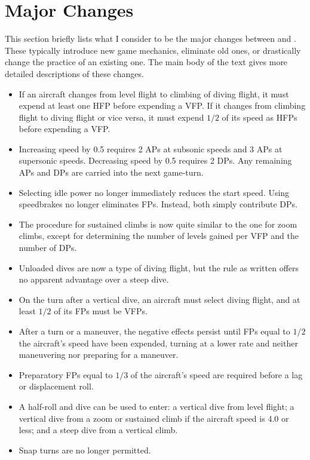 \documentclass[10pt]{article}
\begin{document}
\section{Major Changes}

This section briefly lists what I consider to be the major changes between {\AirSup} and {\AirPow}. These  typically introduce new game mechanics, eliminate old ones, or drastically change the practice of an existing one. The main body of the text gives more detailed descriptions of these changes.

\begin{itemize}
    \item If an aircraft changes from level flight to climbing of diving flight, it must expend at least one HFP before expending a VFP. If it changes from climbing flight to diving flight or vice versa, it must expend $1/2$ of its speed as HFPs before expending a VFP.
    \item Increasing speed by 0.5 requires 2 APs at subsonic speeds and 3 APs at supersonic speeds. Decreasing speed by 0.5 requires 2 DPs. Any remaining APs and DPs are carried into the next game-turn.
    \item Selecting idle power no longer immediately reduces the start speed. Using speedbrakes no longer eliminates FPs. Instead, both simply contribute DPs.
    \item The procedure for sustained climbs is now quite similar to the one for zoom climbs, except for determining the number of levels gained per VFP and the number of DPs.
    \item Unloaded dives are now a type of diving flight, but the rule as written offers no apparent advantage over a steep dive.
    \item On the turn after a vertical dive, an aircraft must select diving flight, and at least $1/2$ of its FPs must be VFPs.
    \item After a turn or a maneuver, the negative effects persist until FPs equal to $1/2$ the aircraft's speed have been expended, turning at a lower rate and neither maneuvering nor preparing for a maneuver.
    \item Preparatory FPs equal to $1/3$ of the aircraft's speed are required before a lag or displacement roll.
    \item A half-roll and dive can be used to enter: a vertical dive from level flight; a vertical dive from a zoom or sustained climb if the aircraft speed is 4.0 or less; and a steep dive from a vertical climb.
    \item Snap turns are no longer permitted.
\end{itemize}
\end{document}

